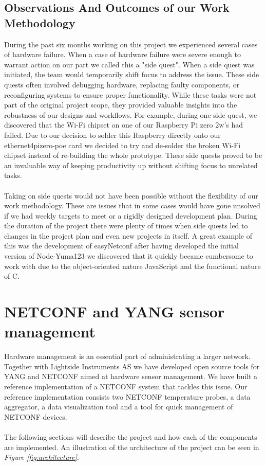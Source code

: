 \documentclass[12pt]{article}
\begin{document}
\subsection{Observations And Outcomes of our Work Methodology}
During the past six months working on this project we experienced several cases of hardware failure.
When a case of hardware failure were severe enough to warrant action on our part we called this a "side quest".
When a side quest was initiated, the team would temporarily shift focus to address the issue. 
These side quests often involved debugging hardware, replacing faulty components, 
or reconfiguring systems to ensure proper functionality. 
While these tasks were not part of the original project scope, 
they provided valuable insights into the robustness of our designs and workflows. 
For example, during one side quest, we discovered that the Wi-Fi chipset on one of 
our Raspberry Pi zero 2w's had failed. Due to our decision to solder this Raspberry 
directly onto our ethernet4pizero-poe card we decided to try and de-solder the broken Wi-Fi chipset
instead of re-building the whole prototype. 
These side quests proved to be an invaluable way of keeping 
productivity up without shifting focus to unrelated tasks. 
\\
\\
Taking on side quests would not have been possible without the flexibility 
of our work methodology. These are issues that in some cases would have gone 
unsolved if we had weekly targets to meet or a rigidly designed development plan.
During the duration of the project there were plenty of times when side quests led 
to changes in the project plan and even new projects in itself. A great example of this 
was the development of easyNetconf after having developed the initial version of Node-Yuma123
we discovered that it quickly became cumbersome to work with due to the object-oriented nature 
JavaScript and the functional nature of C. 

\section{NETCONF and YANG sensor management}

Hardware management is an essential part of administrating a larger network. 
Together with Lightside Instruments AS we have 
developed open source tools for YANG and NETCONF aimed at hardware sensor management.
We have built a reference implementation of a NETCONF system that tackles this issue.
Our reference implementation consists two NETCONF temperature probes,
a data aggregator, a data visualization tool and
a tool for quick management of NETCONF devices.
\\
\\
The following sections will describe the project and how each of the components are implemented.
An illustration of the architecture of the project can be seen in \textit{Figure \ref{fig:architecture}}.
\end{document}
